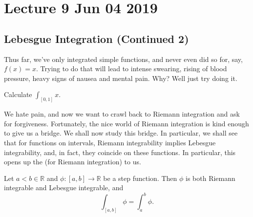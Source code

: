 \documentclass[notoc,notitlepage]{tufte-book}
\begin{document}


\chapter{Lecture 9 Jun 04 2019}%
\label{chp:lecture_9_jun_04_2019}

\section{Lebesgue Integration (Continued 2)}%
\label{sec:lebesgue_integration_continued_2}

Thus far, we've only integrated simple functions, and never even did so for,
say, $f(x) = x$. Trying to do that will lead to intense swearing, rising of
blood pressure, heavy signs of nausea and mental pain. Why? Well just try doing
it.

\begin{ex}
  Calculate $\int_{[0, 1]} x$.
\end{ex}

We hate pain, and now we want to crawl back to Riemann integration and ask for
forgiveness. Fortunately, the nice world of Riemann integration is kind enough
to give us a bridge. We shall now study this bridge. In particular, we shall see
that for  functions on  intervals,
Riemann integrability implies Lebesgue integrability, and, in fact, they
coincide on these functions. In particular, this opens up the
 (for Riemann integration) to us.

\begin{lemma}\label{lemma:riemann_integrability_and_lebesgue_integrability_of_step_functions}
  Let $a < b \in \mathbb{R}$ and $\phi : [a, b] \to \mathbb{R}$ be a step
  function. Then $\phi$ is both Riemann integrable and Lebesgue integrable, and
  \begin{equation*}
    \int_{[a, b]} \phi = \int_{a}^{b} \phi.
  \end{equation*}
\end{lemma}
\end{document}
